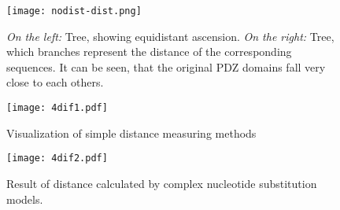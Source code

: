 \begin{figure}
\centering
\texttt{[image: nodist-dist.png]}
\caption{\emph{On the left:} Tree, showing equidistant ascension. \emph{On the right:} Tree, which branches represent the distance of the corresponding sequences. It can be seen, that the original PDZ domains fall very close to each others.}
\label{comapre2}
\end{figure}


\begin{figure}
\centering
\texttt{[image: 4dif1.pdf]}
\caption{Visualization of simple distance measuring methods}
\label{r1}
\end{figure}

\begin{figure}
\centering
\texttt{[image: 4dif2.pdf]}
\caption{Result of distance calculated by complex nucleotide substitution models.}
\label{r2}
\end{figure}

